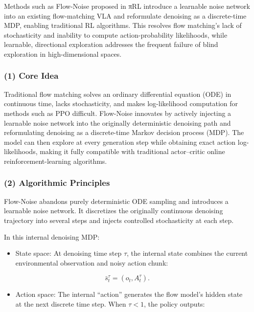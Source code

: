 Methods such as Flow-Noise proposed in πRL introduce a learnable noise network into an existing flow-matching VLA and reformulate denoising as a discrete-time MDP, enabling traditional RL algorithms. This resolves flow matching's lack of stochasticity and inability to compute action-probability likelihoods, while learnable, directional exploration addresses the frequent failure of blind exploration in high-dimensional spaces.

\hypertarget{core-idea-3}{%
\subsubsection{(1) Core Idea}\label{core-idea-3}}

Traditional flow matching solves an ordinary differential equation (ODE) in continuous time, lacks stochasticity, and makes log-likelihood computation for methods such as PPO difficult. Flow-Noise innovates by actively injecting a learnable noise network into the originally deterministic denoising path and reformulating denoising as a discrete-time Markov decision process (MDP). The model can then explore at every generation step while obtaining exact action log-likelihoods, making it fully compatible with traditional actor--critic online reinforcement-learning algorithms.

\hypertarget{algorithmic-principles}{%
\subsubsection{(2) Algorithmic Principles}\label{algorithmic-principles}}

Flow-Noise abandons purely deterministic ODE sampling and introduces a learnable noise network. It discretizes the originally continuous denoising trajectory into several steps and injects controlled stochasticity at each step.

In this internal denoising MDP:

\begin{itemize}
\tightlist
\item
{}
  State space: At denoising time step \(\tau\), the internal state combines the current environmental observation and noisy action chunk:
\end{itemize}

\[
\bar{s}_t^\tau=(o_t,A_t^\tau).
\]

\begin{itemize}
\tightlist
\item
{}
  Action space: The internal ``action'' generates the flow model's hidden state at the next discrete time step. When \(\tau<1\), the policy outputs:
\end{itemize}

